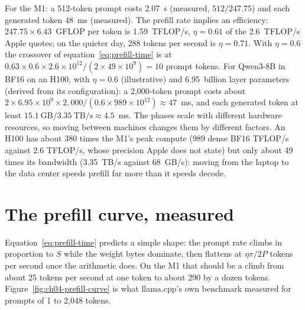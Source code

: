 For the M1: a 512-token prompt costs 2.07~s (measured, $512/247.75$) and each
generated token 48~ms (measured). The prefill rate implies an efficiency:
$247.75 \times 6.43$~GFLOP per token is 1.59~TFLOP/s, $\eta = 0.61$ of the
2.6~TFLOP/s Apple quotes; on the quieter day, 288 tokens per second is
$\eta = 0.71$. With $\eta = 0.6$ the crossover of
equation~\eqref{eq:prefill-time} is at
$0.63 \times 0.6 \times 2.6\times10^{12} / (2 \times 49\times10^{9}) = 10$
prompt tokens. For Qwen3-8B in BF16 on an H100, with $\eta = 0.6$
(illustrative) and 6.95~billion layer parameters (derived from its
configuration): a 2,000-token prompt costs about
$2\times 6.95\times10^{9}\times 2{,}000 / (0.6\times 989\times10^{12})
\approx 47$~ms, and each generated token at least
$15.1~\text{GB}/3.35~\text{TB/s}\approx 4.5$~ms. The phases scale with
different hardware resources, so moving between machines changes them by
different factors. An H100 has about 380 times the M1's peak compute (989
dense BF16 TFLOP/s against 2.6 TFLOP/s, whose precision Apple does not state)
but only about 49 times its bandwidth (3.35~TB/s against 68~GB/s): moving from
the laptop to the data center speeds prefill far more than it speeds decode.

\section{The prefill curve, measured}

Equation~\eqref{eq:prefill-time} predicts a simple shape: the prompt rate
climbs in proportion to $S$ while the weight bytes dominate, then flattens at
$\eta\pi/2P$ tokens per second once the arithmetic does. On the M1 that should
be a climb from about 25 tokens per second at one token to about 290 by a dozen
tokens. Figure~\ref{fig:ch04-prefill-curve} is what llama.cpp's own benchmark
measured for prompts of 1 to 2,048 tokens.


